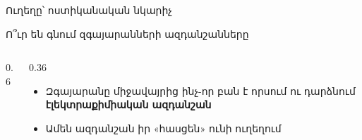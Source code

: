 \begin{frame}{Ուղեղը՝ ոստիկանական նկարիչ}
  \centering
  \par
\end{frame}

\begin{frame}{Ո՞ւր են գնում զգայարանների ազդանշանները}
  \begin{columns}[c]
    \begin{column}{0.6\textwidth}
      \centering
      
    \end{column}
    \begin{column}{0.36\textwidth}
      \begin{itemize}
        \item Զգայարանը միջավայրից ինչ-որ բան է որսում ու դարձնում \textbf{էլեկտրաքիմիական ազդանշան}
        \item<5-> Ամեն ազդանշան իր «հասցեն» ունի ուղեղում
      \end{itemize}
    \end{column}
  \end{columns}
\end{frame}
